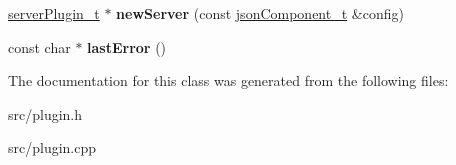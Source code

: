 \begin{DoxyCompactItemize}
\item 
\hypertarget{classplugin__t_a6760ee0002cbf8fa6f6546d3fafd0fb1}{\hyperlink{classserverPlugin__t}{server\-Plugin\-\_\-t} $\ast$ {\bfseries new\-Server} (const \hyperlink{classjsonComponent__t}{json\-Component\-\_\-t} \&config)}\label{classplugin__t_a6760ee0002cbf8fa6f6546d3fafd0fb1}

\item 
\hypertarget{classplugin__t_acd7051209d2a13b90b6c77642bb3ae86}{const char $\ast$ {\bfseries last\-Error} ()}\label{classplugin__t_acd7051209d2a13b90b6c77642bb3ae86}

\end{DoxyCompactItemize}


\-The documentation for this class was generated from the following files\-:\begin{DoxyCompactItemize}
\item 
src/plugin.\-h\item 
src/plugin.\-cpp\end{DoxyCompactItemize}
